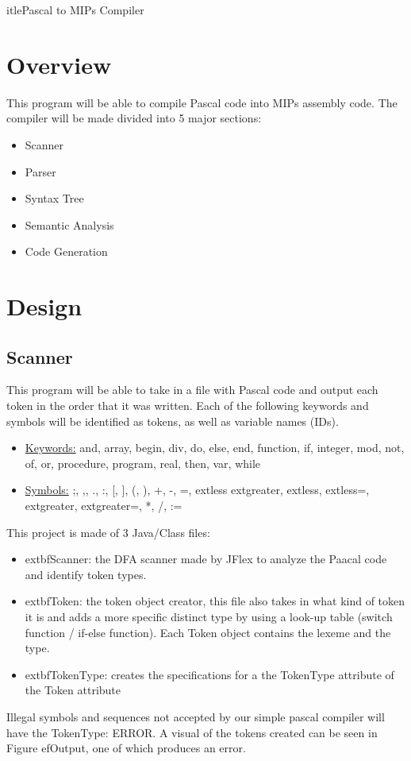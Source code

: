 \documentclass[english]{article}
\begin{document}
   itle{Pascal to MIPs Compiler}
\author{Joseph Miller}
\maketitle


\section{Overview}

This program will be able to compile Pascal code into MIPs assembly code.  The compiler will be made divided into 5 major sections:

\begin{itemize}
\item
Scanner
\item
Parser
\item
Syntax Tree
\item
Semantic Analysis
\item
Code Generation
\end{itemize}


\par\addvspace{1cm}%
\section{Design}

\subsection{Scanner}

This program will be able to take in a file with Pascal code and output each token in the order that it was written. Each of the following keywords and symbols will be identified as tokens, as well as variable names (IDs).


\begin{itemize}
\item
\underline{Keywords:} and, array, begin, div, do, else, end, function, if, integer, mod, not, of, or, procedure, program, real, then, var, while
\item
\underline{Symbols:} ;, ,, ., :, [, ], (, ), +, -, =,    extless   extgreater,    extless,    extless=,    extgreater,    extgreater=, *, /, :=
\end{itemize}
This project is made of 3 Java/Class files:
\begin{itemize}

\item
   extbf{Scanner}: the DFA scanner made by JFlex to analyze the Paacal code and identify token types.
\item
   extbf{Token}: the token object creator, this file also takes in what kind of token it is and adds a more specific distinct type by using a look-up table (switch function / if-else function). Each Token object contains the lexeme and the type.
\item
   extbf{TokenType}: creates the specifications for a the TokenType attribute of the Token attribute
\end{itemize}
Illegal symbols and sequences not accepted by our simple pascal compiler will have the TokenType: ERROR. A visual of the tokens created can be seen in Figure ef{Output}, one of which produces an error.
\end{document}
